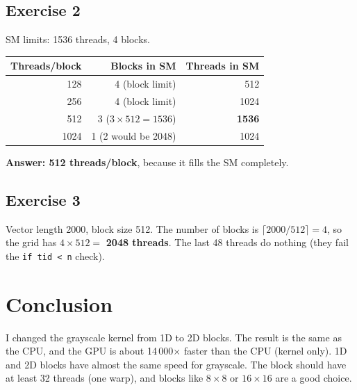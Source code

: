 \documentclass[11pt,a4paper]{article}
\begin{document}
\subsection*{Exercise 2}
SM limits: 1536 threads, 4 blocks.
\begin{center}
\begin{tabular}{|r|r|r|}
\hline
Threads/block & Blocks in SM & Threads in SM \\ \hline
128  & 4 (block limit)           & 512  \\ \hline
256  & 4 (block limit)           & 1024 \\ \hline
512  & 3 ($3 \times 512 = 1536$)  & \textbf{1536} \\ \hline
1024 & 1 (2 would be 2048)       & 1024 \\ \hline
\end{tabular}
\end{center}
\textbf{Answer: 512 threads/block}, because it fills the SM completely.

\subsection*{Exercise 3}
Vector length 2000, block size 512. The number of blocks is
$\lceil 2000 / 512 \rceil = 4$, so the grid has
$4 \times 512 = $ \textbf{2048 threads}. The last 48 threads do nothing
(they fail the \texttt{if tid < n} check).

\section{Conclusion}
I changed the grayscale kernel from 1D to 2D blocks. The result is the
same as the CPU, and the GPU is about 14\,000$\times$ faster than the
CPU (kernel only). 1D and 2D blocks have almost the same speed for
grayscale. The block should have at least 32 threads (one warp), and
blocks like $8 \times 8$ or $16 \times 16$ are a good choice.
\end{document}
